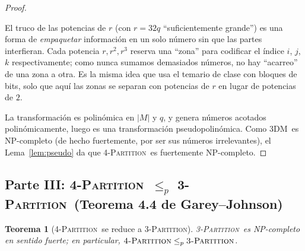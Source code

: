 \documentclass[12pt,a4paper]{article}
\newtheorem{theorem}{Teorema}
\theoremstyle{definition}
\theoremstyle{remark}
\newcommand{\TPART}{\textsc{3-Partition}}
\newcommand{\FPART}{\textsc{4-Partition}}
\newcommand{\DM}{\textsc{3DM}}
\begin{document}
\begin{proof}
\begin{intuicion}
El truco de las potencias de $r$ (con $r = 32q$ ``suficientemente grande'') es una
forma de \emph{empaquetar} información en un solo número sin que las partes
interfieran. Cada potencia $r, r^2, r^3$ reserva una ``zona'' para codificar el
índice $i$, $j$, $k$ respectivamente; como nunca sumamos demasiados números, no
hay ``acarreo'' de una zona a otra. Es la misma idea que usa el temario de clase
con bloques de bits, solo que aquí las zonas se separan con potencias de $r$ en
lugar de potencias de $2$.
\end{intuicion}

La transformación es polinómica en $|M|$ y $q$, y genera números acotados
polinómicamente, luego es una transformación pseudopolinómica. Como \DM\ es
NP-completo (de hecho fuertemente, por ser sus números irrelevantes), el
Lema~\ref{lem:pseudo} da que \FPART\ es fuertemente NP-completo.
\end{proof}

\subsection{Parte III: \FPART\ $\leq_p$ \TPART\ (Teorema 4.4 de Garey--Johnson)}

\begin{theorem}[\FPART\ se reduce a \TPART]
\label{thm:4part-to-3part}
\TPART\ es NP-completo en sentido fuerte; en particular, $\FPART \leq_p \TPART$.
\end{theorem}
\end{document}
